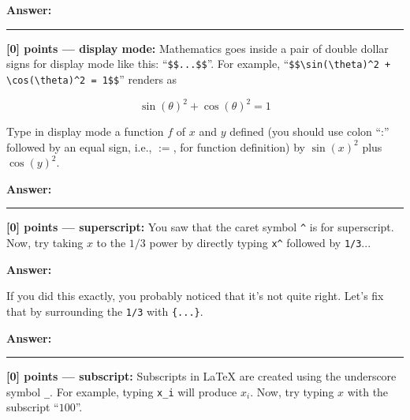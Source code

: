 \documentclass{article}
\newcommand{\mydivider}{\vspace{1em}\hrule\vspace{1em}}
\begin{document}
\begin{tcolorbox}
\textbf{Answer: }



\end{tcolorbox}


\mydivider
\noindent\textbf{[0] points --- display mode:} Mathematics goes inside a pair of double dollar signs for display mode like this: ``\verb|$$...$$|''. For example,
``\verb|$$\sin(\theta)^2 + \cos(\theta)^2 = 1$$|'' renders as

$$\sin(\theta)^2 + \cos(\theta)^2 = 1$$

 Type in display mode a function $f$ of $x$ and $y$ defined (you should use colon ``:'' followed by an equal sign, i.e., $:=$, for function definition) by $\sin(x)^2$ plus $\cos(y)^2$.


\begin{tcolorbox}
\textbf{Answer: }


\end{tcolorbox}




\mydivider
\noindent\textbf{[0] points --- superscript:} You saw that the caret symbol \verb|^| is for superscript. Now, try taking $x$ to the $1/3$ power by directly typing \verb|x^| followed by \verb|1/3|...

\begin{tcolorbox}
\textbf{Answer: }


\end{tcolorbox}

If you did this exactly, you probably noticed that it's not quite right. Let's fix that by surrounding the \verb|1/3| with \verb|{...}|.

\begin{tcolorbox}
\textbf{Answer: }


\end{tcolorbox}



\mydivider

\noindent\textbf{[0] points --- subscript:} Subscripts in LaTeX are created using the underscore symbol \verb|_|. For example, typing \verb|x_i| will produce $x_i$. Now, try typing $x$ with the subscript ``$100$''.
\end{document}
